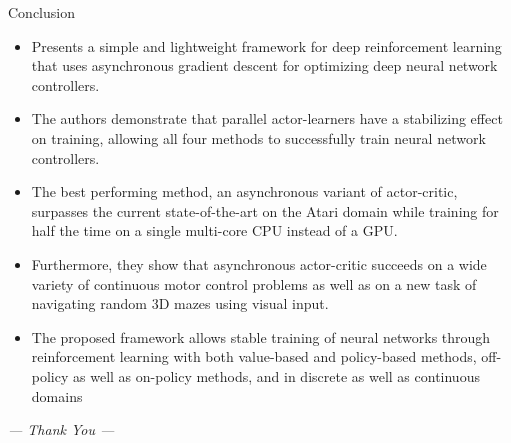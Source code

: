 \documentclass[aspectratio=169]{beamer}
\begin{document}
\begin{frame}[label={sec:org45bc836}]{Conclusion}
\begin{itemize}
\item Presents a simple and lightweight framework for deep reinforcement learning that uses asynchronous gradient descent for optimizing deep neural network controllers.
\item The authors demonstrate that parallel actor-learners have a stabilizing effect on training, allowing all four methods to successfully train neural network controllers.
\item The best performing method, an asynchronous variant of actor-critic, surpasses the current state-of-the-art on the Atari domain while training for half the time on a single multi-core CPU instead of a GPU.
\item Furthermore, they show that asynchronous actor-critic succeeds on a wide variety of continuous motor control problems as well as on a new task of navigating random 3D mazes using visual input.
\item The proposed framework allows stable training of neural networks through reinforcement learning with both value-based and policy-based methods, off-policy as well as on-policy methods, and in discrete as well as continuous domains
\end{itemize}

\centering \Large \emph{--- Thank You ---}
\end{frame}
\end{document}
